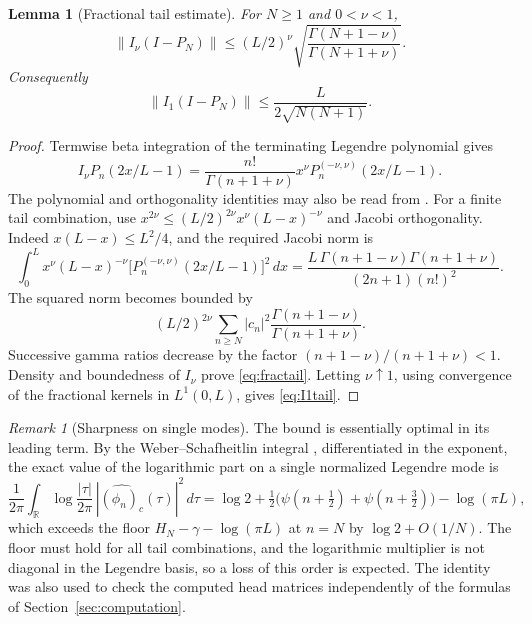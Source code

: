 \documentclass[11pt]{article}
\numberwithin{equation}{section}
\newtheorem{lemma}[theorem]{Lemma}
\theoremstyle{definition}
\theoremstyle{remark}
\newtheorem{remark}[theorem]{Remark}
\newcommand{\RR}{\mathbb R}
\newcommand{\norm}[1]{\lVert#1\rVert}
\begin{document}
\begin{lemma}[Fractional tail estimate]\label{lem:fractional}
For $N\ge1$ and $0<\nu<1$,
\begin{equation}\label{eq:fractail}
 \norm{I_\nu(I-P_N)}\le
 (L/2)^\nu\sqrt{\frac{\Gamma(N+1-\nu)}{\Gamma(N+1+\nu)}}.
\end{equation}
Consequently
\begin{equation}\label{eq:I1tail}
 \norm{I_1(I-P_N)}\le\frac{L}{2\sqrt{N(N+1)}}.
\end{equation}
\end{lemma}
\begin{proof}
Termwise beta integration of the terminating Legendre polynomial gives
\[
 I_\nu P_n(2x/L-1)=
 \frac{n!}{\Gamma(n+1+\nu)}x^\nu
 P_n^{(-\nu,\nu)}(2x/L-1).
\]
The polynomial and orthogonality identities may also be read from
\cite[\S\S18.3,18.5,18.17]{DLMF}. For a finite tail combination, use
$x^{2\nu}\le(L/2)^{2\nu}x^\nu(L-x)^{-\nu}$ and Jacobi orthogonality.
Indeed $x(L-x)\le L^2/4$, and the required Jacobi norm is
\[
 \int_0^L x^\nu(L-x)^{-\nu}
 \bigl[P_n^{(-\nu,\nu)}(2x/L-1)\bigr]^2\,dx
 =\frac{L\,\Gamma(n+1-\nu)\Gamma(n+1+\nu)}
 {(2n+1)(n!)^2}.
\]
The squared norm becomes bounded by
\[
 (L/2)^{2\nu}\sum_{n\ge N}|c_n|^2
 \frac{\Gamma(n+1-\nu)}{\Gamma(n+1+\nu)}.
\]
Successive gamma ratios decrease by the factor
$(n+1-\nu)/(n+1+\nu)<1$. Density and boundedness of $I_\nu$ prove
\eqref{eq:fractail}. Letting $\nu\uparrow1$, using convergence of the
fractional kernels in $L^1(0,L)$, gives \eqref{eq:I1tail}.
\end{proof}

\begin{remark}[Sharpness on single modes]\label{rem:sharp}
The bound is essentially optimal in its leading term. By the
Weber--Schafheitlin integral \cite[\S10.22(ii)]{DLMF}, differentiated in the
exponent, the exact value of the logarithmic part on a single normalized
Legendre mode is
\[
 \frac1{2\pi}\int_{\RR}\log\frac{|\tau|}{2\pi}\,|\widehat{(\phi_n)_c}(\tau)|^2\,d\tau
 =\log2+\tfrac12\bigl(\psi(n+\tfrac12)+\psi(n+\tfrac32)\bigr)-\log(\pi L),
\]
which exceeds the floor $H_N-\gamma-\log(\pi L)$ at $n=N$ by
$\log2+O(1/N)$. The floor must hold for all tail combinations, and the
logarithmic multiplier is not diagonal in the Legendre basis, so a loss of this
order is expected. The identity was also used to check the computed head
matrices independently of the formulas of Section~\ref{sec:computation}.
\end{remark}
\end{document}
